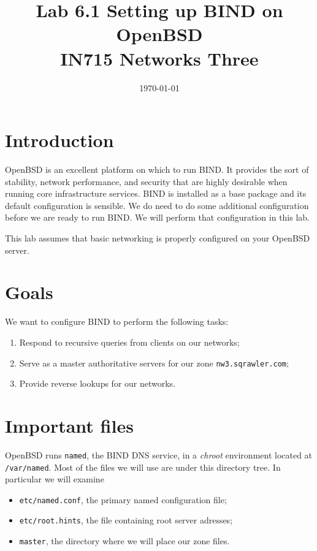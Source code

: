 \documentclass{article}
\begin{document}
\title{ Lab 6.1 Setting up BIND on OpenBSD \\ IN715 Networks Three}
\date{\today}
\maketitle

\section*{Introduction}
OpenBSD is an excellent platform on which to run BIND.  It provides the sort of stability, network performance, and security that are highly desirable when running core infrastructure services.  BIND is installed as a base package and its default configuration is sensible.  We do need to do some additional configuration before we are ready to run BIND.  We will perform that configuration in this lab.

This lab assumes that basic networking is properly configured on your OpenBSD server.

\section{Goals}
We want to configure BIND to perform the following tasks:

\begin{enumerate}
  \item Respond to recursive queries from clients on our networks;
  \item Serve as a master authoritative servers for our zone \texttt{nw3.sqrawler.com};
  \item Provide reverse lookups for our networks.
\end{enumerate}

\section{Important files}
OpenBSD runs \texttt{named}, the BIND DNS service, in a \emph{chroot} environment located at \texttt{/var/named}.  Most of the files we will use are under this directory tree.  In particular we will examine

\begin{itemize}
  \item \texttt{etc/named.conf}, the primary named configuration file;
  \item \texttt{etc/root.hints}, the file containing root server adresses;
  \item \texttt{master}, the directory where we will place our zone files.
\end{itemize}
\end{document}
